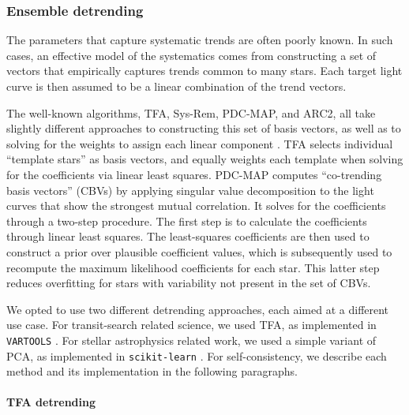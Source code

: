 \documentclass[12pt,twocolumn,tighten]{aastex62}
\begin{document}
\subsubsection{Ensemble detrending}
\label{subsubsec:ensemble}

The parameters that capture systematic trends are often poorly known.
In such cases, an effective model of the systematics comes from
constructing a set of vectors that empirically captures trends common
to many stars.  Each target light curve is then assumed to be a linear
combination of the trend vectors.

The well-known algorithms, TFA, Sys-Rem, PDC-MAP, and ARC2, all take
slightly different approaches to constructing this set of basis
vectors, as well as to solving for the weights to assign each linear
component
\citep{kovacs_trend_2005,tamuz_correcting_2005,smith_pdc_2012,aigrain_robust_2017}.
TFA selects individual ``template stars'' as basis vectors, and
equally weights each template when solving for the coefficients via
linear least squares.  PDC-MAP computes ``co-trending basis vectors''
(CBVs) by applying singular value decomposition to the light curves
that show the strongest mutual correlation.  It solves for the
coefficients through a two-step procedure.  The first step is to
calculate the coefficients through linear least squares.  The
least-squares coefficients are then used to construct a prior over
plausible coefficient values, which is subsequently used to recompute
the maximum likelihood coefficients for each star.  This latter step
reduces overfitting for stars with variability not present in the set
of CBVs.

We opted to use two different detrending approaches, each aimed
at a different use case.  For transit-search related science,
we used TFA, as implemented in \texttt{VARTOOLS}
\citep{kovacs_trend_2005,Hartman_Bakos_2016}.  For stellar
astrophysics related work, we used a simple variant of PCA, as
implemented in \texttt{scikit-learn} \citep{sklearn_2011}.  For
self-consistency, we describe each method and its implementation in
the following paragraphs.

\paragraph{TFA detrending}
\end{document}

